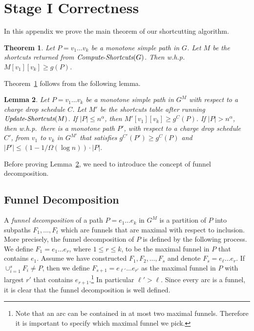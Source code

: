 \documentclass[11pt]{article}
\newtheorem{theorem}{Theorem}[section]
\newtheorem{lemma}[theorem]{Lemma}
\newcommand{\ComputeS}{\mbox{{\it Compute}-{\it Shortcuts}}}
\newcommand{\UpdateS}{\mbox{{\it Update}-{\it Shortcuts}}}
\begin{document}
\section{Stage I Correctness}\label{sec:correctness}

In this appendix we prove the main theorem of our shortcutting algorithm.
\begin{theorem}\label{theorem:shortcut}
    Let $P = v_1 \ldots v_k$ be a monotone simple path in $G$. Let $M$ be the shortcuts returned from $\ComputeS(G)$. Then w.h.p.\ $M[v_1][v_k]\ge g(P)$.
\end{theorem}

Theorem~\ref{theorem:shortcut} follows from the following lemma. 

\begin{lemma}\label{lemma:paths-shrink}
    Let $P= v_1\ldots v_k$ be a monotone simple path in $G^M$ with respect to a charge drop schedule $C$. Let $M'$ be the shortcuts table after running $\UpdateS(M)$. If $|P| \le  n^\alpha$, then $M'[v_1][v_k] \ge g^{C}(P)$. If $|P| > n^\alpha$, then w.h.p.\ there is a monotone path $P'$, with respect to a charge drop schedule $C'$, from $v_1$ to $v_k$ in $G^{M'}$ that satisfies $g^{C'}(P')\ge g^{C}(P)$ and $|P'| \le (1- 1/\Omega(\log n))\cdot |P|$.
\end{lemma}


Before proving Lemma~\ref{lemma:paths-shrink}, we need to introduce the concept of funnel decomposition.

\subsection{Funnel Decomposition}
 A \emph{funnel decomposition} of a path $P=e_1\ldots e_k$ in $G^M$ is a partition of $P$ into subpaths $F_1,\ldots,F_t$ which are funnels that are maximal with respect to inclusion. More precisely, the funnel decomposition of $P$ is defined by the following process. We define $F_1 = e_1 \ldots e_r$, where $1\le r\le k$, to be the maximal funnel in $P$ that contains $e_1$. Assume we have constructed $F_1,F_2,\ldots, F_s$ and denote $F_s = e_{\ell} \ldots e_r$. If $\cup_{i=1}^s F_i \neq P$, then we define $F_{s+1}= e_{\ell'}\ldots e_{r'}$ as the maximal funnel in $P$ with largest $r'$ that contains $e_{r+1}$.\footnote{Note that an arc can be contained in at most two maximal funnels. Therefore it is important to specify which maximal funnel we pick.} In particular $\ell'>\ell$. Since every arc is a funnel, it is clear that the funnel decomposition is well defined. 
 
\end{document}
